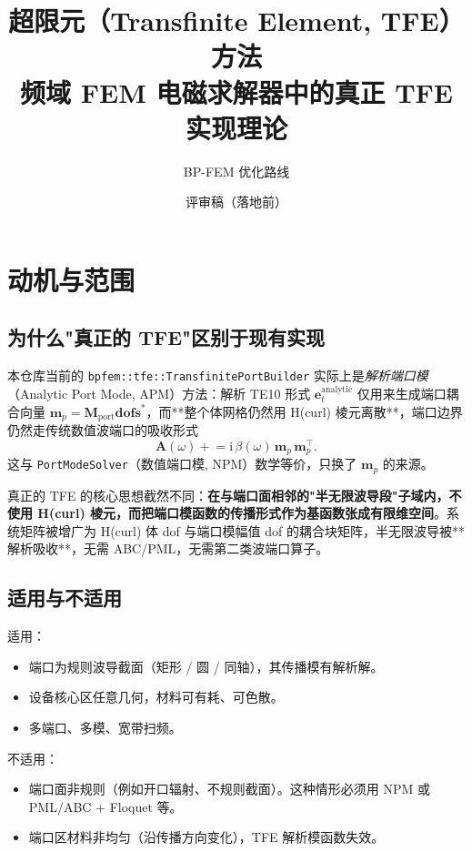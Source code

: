 \documentclass[11pt,a4paper]{ctexart}
\title{超限元（Transfinite Element, TFE）方法 \\ 频域 FEM 电磁求解器中的真正 TFE 实现理论}
\author{BP-FEM 优化路线}
\date{评审稿（落地前）}
\newcommand{\im}{\mathrm{i}}
\begin{document}
\maketitle
\tableofcontents
\bigskip

\section{动机与范围}

\subsection{为什么"真正的 TFE"区别于现有实现}

本仓库当前的 \texttt{bpfem::tfe::TransfinitePortBuilder} 实际上是\emph{解析端口模}（Analytic Port Mode, APM）方法：解析 TE10 形式 $\bm e_t^{\text{analytic}}$ 仅用来生成端口耦合向量 $\bm m_p = \bm M_{\text{port}} \bm{dofs}^*$，而**整个体网格仍然用 H(curl) 棱元离散**，端口边界仍然走传统数值波端口的吸收形式
\[
  \bm A(\omega) \mathrel{+}= \im\,\beta(\omega)\,\bm m_p\,\bm m_p^{\!\top}.
\]
这与 \texttt{PortModeSolver}（数值端口模, NPM）数学等价，只换了 $\bm m_p$ 的来源。

真正的 TFE \cite{Cendes1989, Lee1991, Webb1996} 的核心思想截然不同：\textbf{在与端口面相邻的"半无限波导段"子域内，不使用 H(curl) 棱元，而把端口模函数的传播形式作为基函数张成有限维空间}。系统矩阵被增广为 H(curl) 体 dof 与端口模幅值 dof 的耦合块矩阵，半无限波导被**解析吸收**，无需 ABC/PML，无需第二类波端口算子。

\subsection{适用与不适用}

适用：

\begin{itemize}
\item 端口为规则波导截面（矩形 / 圆 / 同轴），其传播模有解析解。
\item 设备核心区任意几何，材料可有耗、可色散。
\item 多端口、多模、宽带扫频。
\end{itemize}

不适用：

\begin{itemize}
\item 端口面非规则（例如开口辐射、不规则截面）。这种情形必须用 NPM 或 PML/ABC + Floquet 等。
\item 端口区材料非均匀（沿传播方向变化），TFE 解析模函数失效。
\end{itemize}
\end{document}
